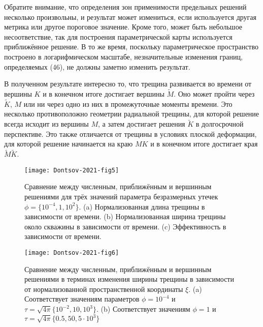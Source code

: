 \documentclass[main.tex]{subfiles}
\begin{document}
\eeq
Обратите внимание, что определения зон применимости предельных решений несколько произвольны, и результат может измениться, если используется другая метрика или другое пороговое значение.
Кроме того, может быть небольшое несоответствие, так для построения параметрической карты используется приближённое решение.
В то же время, поскольку параметрическое пространство построено в логарифмическом масштабе, незначительные изменения границ, определяемых (46), не должны заметно изменить результат.

В полученном результате интересно то, что трещина развивается во времени от вершины $K$ и в конечном итоге достигает вершины $\tilde{M}$.
Оно может пройти через $\tilde{K}$, $M$ или ни через одно из них в промежуточные моменты времени.
Это несколько противоположно геометрии радиальной трещины, для которой решение всегда исходит из вершины $M$, а затем достигает решения $\tilde{K}$ в долгосрочной перспективе.
Это также отличается от трещины в условиях плоской деформации, для которой решение начинается на краю $MK$ и в конечном итоге достигает края $\tilde{M}\tilde{K}$.

\begin{figure}[H]
\center
\texttt{[image: Dontsov-2021-fig5]}
\vspace*{-10mm}
\caption{Сравнение между численным, приближённым и вершинным решениями для трёх значений параметра безразмерных утечек $\phi=\{10^{-4},1,10^2\}$. (a) Нормализованная длина трещины в зависимости от времени. (b) Нормализованная ширина трещины около скважины в зависимости от времени. (c) Эффективность в зависимости от времени.}
\label{fig:Dontsov-2021-fig5}
\end{figure}

\begin{figure}[H]
\center
\texttt{[image: Dontsov-2021-fig6]}
\vspace*{-10mm}
\caption{Сравнение между численным, приближённым и вершинным решениями в терминах изменения ширины трещины в зависимости от нормализованной пространственной координаты $\xi$. (a) Соответствует значениям параметров $\phi=10^{-4}$ и $\tau=\sqrt{4\pi}\{10^{-2},10,10^3\}$. (b) Соответствует значениям $\phi=1$ и $\tau=\sqrt{4\pi}\{0.5,50,5\cdot10^3\}$}
\label{fig:Dontsov-2021-fig6}
\end{figure}
\end{document}
